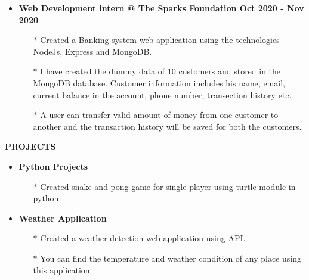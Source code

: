 \documentclass{article}
\begin{document}
{{{{{{\begin{itemize}
\end{itemize}
\begin{itemize}
\item   {\bf Web Development intern @ The Sparks Foundation {\hfill Oct 2020 - Nov 2020}}
\vspace{-2mm}
\begin{itemize}
  \vspace{0.5mm}
  \item[$\ast$] Created a Banking system web application using the technologies NodeJs, Express and MongoDB. 
  \vspace{-0.5mm}
  \item[$\ast$] I have created the dummy data of 10 customers and stored in the MongoDB database. Customer information includes his name, email, current balance in the account, phone number, transection history etc.
  \vspace{-0.5mm}
  \item[$\ast$] A user can transfer valid amount of money from one customer to another and the transaction history will be saved for both the customers.  
\end{itemize}

\end{itemize}




\vspace{4mm}

{\medskip
\large { {\bf  \color[rgb]{0,0,1} PROJECTS}} \hrulefill \par
\normalsize

\begin{itemize}


\item   {\bf Python Projects}
\vspace{-2mm}
\begin{itemize}
  \vspace{0.5mm}
  \item[$\ast$] Created snake and pong game for single player using turtle module in python.
 
\end{itemize}


\item   {\bf Weather Application}
\vspace{-2mm}
\begin{itemize}
  \vspace{0.5mm}
  \item[$\ast$] Created a weather detection web application using API.
  \vspace{-0.5mm}
  \item[$\ast$] You can find the temperature and weather condition of any place using this application.
\end{itemize}


\end{itemize}}}}}}}}
\end{document}

